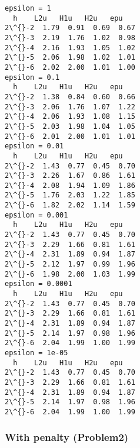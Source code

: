 \documentclass[11pt]{article}
\begin{document}
    \begin{Verbatim}[commandchars=\\\{\}]
epsilon = 1
  h    L2u   H1u   H2u   epu
2\^{}-2  1.79  0.91  0.69  0.67
2\^{}-3  2.19  1.76  1.02  0.98
2\^{}-4  2.16  1.93  1.05  1.02
2\^{}-5  2.06  1.98  1.02  1.01
2\^{}-6  2.02  2.00  1.01  1.00
epsilon = 0.1
  h    L2u   H1u   H2u   epu
2\^{}-2  1.38  0.84  0.60  0.66
2\^{}-3  2.06  1.76  1.07  1.22
2\^{}-4  2.06  1.93  1.08  1.15
2\^{}-5  2.03  1.98  1.04  1.05
2\^{}-6  2.01  2.00  1.01  1.01
epsilon = 0.01
  h    L2u   H1u   H2u   epu
2\^{}-2  1.43  0.77  0.45  0.70
2\^{}-3  2.26  1.67  0.86  1.61
2\^{}-4  2.08  1.94  1.09  1.86
2\^{}-5  1.76  2.03  1.22  1.85
2\^{}-6  1.82  2.02  1.14  1.59
epsilon = 0.001
  h    L2u   H1u   H2u   epu
2\^{}-2  1.43  0.77  0.45  0.70
2\^{}-3  2.29  1.66  0.81  1.61
2\^{}-4  2.31  1.89  0.94  1.87
2\^{}-5  2.12  1.97  0.99  1.96
2\^{}-6  1.98  2.00  1.03  1.99
epsilon = 0.0001
  h    L2u   H1u   H2u   epu
2\^{}-2  1.43  0.77  0.45  0.70
2\^{}-3  2.29  1.66  0.81  1.61
2\^{}-4  2.31  1.89  0.94  1.87
2\^{}-5  2.14  1.97  0.98  1.96
2\^{}-6  2.04  1.99  1.00  1.99
epsilon = 1e-05
  h    L2u   H1u   H2u   epu
2\^{}-2  1.43  0.77  0.45  0.70
2\^{}-3  2.29  1.66  0.81  1.61
2\^{}-4  2.31  1.89  0.94  1.87
2\^{}-5  2.14  1.97  0.98  1.96
2\^{}-6  2.04  1.99  1.00  1.99
    \end{Verbatim}

    \subsubsection{With penalty (Problem2)}\label{with-penalty-problem2}
\end{document}

